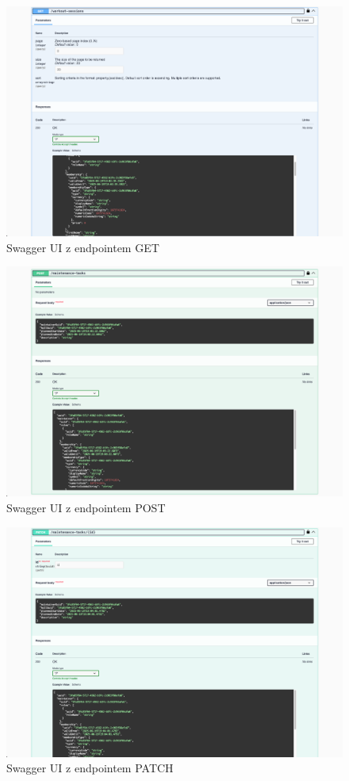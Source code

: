 \documentclass[../../spr.tex]{subfiles}
\begin{document}
\begin{figure}
  \centering
  \includegraphics[width=\textwidth]{swaggerget.png}
  \caption{Swagger UI z endpointem GET}
\end{figure}

\begin{figure}
  \centering
  \includegraphics[width=\textwidth]{swaggerpost.png}
  \caption{Swagger UI z endpointem POST}
\end{figure}

\begin{figure}
  \centering
  \includegraphics[width=\textwidth]{swaggerpatch.png}
  \caption{Swagger UI z endpointem PATCH}
\end{figure}
\end{document}
